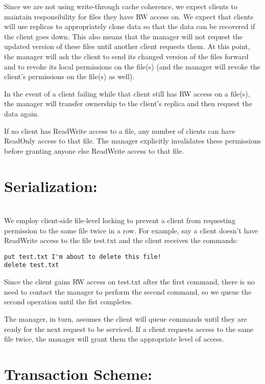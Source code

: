 \documentclass[11pt]{article}
\begin{document}
Since we are not using write-through cache coherence, we expect clients to maintain responsibility for files they have RW access on. 
We expect that clients will use replicas to appropriately clone data so that the data can be recovered if the client goes down. This
also means that the manager will not request the updated version of these files until another client requests them. At this point,
the manager will ask the client to send its changed version of the files forward and to revoke its local permissions on the file(s) (and
the manager will revoke the client's permissions on the file(s) as well).

In the event of a client failing while that client still has RW access on a file(s), the manager will transfer ownership to the client's
replica and then request the data again.

If no client has ReadWrite access to a file, any number of clients can have ReadOnly access to that file. The manager explicitly invalidates these permissions before granting anyone else ReadWrite access to that file. \\

\section{Serialization:} \\

We employ client-side file-level locking to prevent a client from requesting permission to the same file twice in a row.
For example, say a client doesn't have ReadWrite access to the file test.txt and the client receives the commands:

\begin{verbatim}
put test.txt I'm about to delete this file!
delete test.txt
\end{verbatim}

Since the client gains RW access on test.txt after the first command, there is no need to contact the manager to perform the second command, so we queue the second operation until the fist completes.

The manager, in turn, assumes the client will queue commands until they are ready for the next request to be serviced. 
If a client requests access to the same file twice, the manager will grant them the appropriate level of access. \\

\section{Transaction Scheme:} \\
\end{document}
